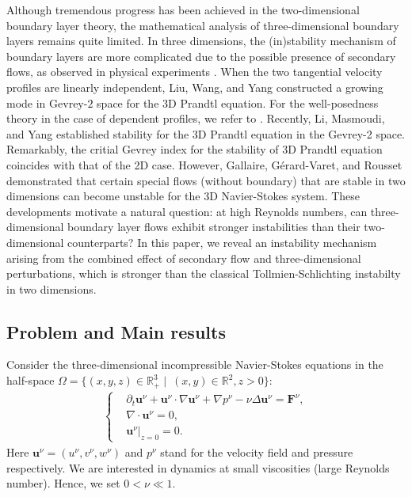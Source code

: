 \documentclass[reqno,11pt]{amsart}
\numberwithin{equation}{section}
\numberwithin{equation}{section}
\theoremstyle{plain}
\begin{document}
Although tremendous progress has been achieved in the two-dimensional boundary layer theory, the mathematical analysis of three-dimensional boundary layers remains quite limited. In three dimensions, the (in)stability mechanism of boundary layers are more complicated due to the possible presence of secondary flows, as observed in physical experiments \cite{RS,SY1985,SRW,Sch}.  When the two tangential velocity profiles are linearly independent, Liu, Wang, and Yang \cite{LWY} constructed a growing mode in Gevrey-$2$ space for the 3D Prandtl equation. For the well-posedness theory in the case of dependent profiles, we refer to \cite{LWY1,LWY2}. Recently, Li, Masmoudi, and Yang \cite{LWX2022} established stability for the 3D Prandtl equation in the Gevrey-2 space. Remarkably, the critial Gevrey index for the stability of 3D Prandtl equation coincides with that of the 2D case. However, Gallaire, G\'erard-Varet, and Rousset \cite{GGR} demonstrated that certain special flows (without boundary) that are stable in two dimensions can become unstable for the 3D Navier-Stokes system. These developments motivate a natural question: at high Reynolds numbers, can three-dimensional boundary layer flows exhibit stronger instabilities than their two-dimensional counterparts? In this paper, we reveal an instability mechanism arising from the combined effect of secondary flow and three-dimensional perturbations, which is stronger than the classical Tollmien-Schlichting instabilty in two dimensions.


\subsection{Problem and Main results}

Consider the three-dimensional incompressible Navier-Stokes equations in the half-space $\Omega=\{(x,y,z)\in \mathbb{R}_+^3\mid~(x,y)\in\mathbb{R}^2, z>0\}:$
\begin{align}\label{NS}
    \left\{
    \begin{aligned}
        &\partial_t \textbf{u}^\nu+\textbf{u}^\nu\cdot\nabla \textbf{u}^\nu+\nabla p^\nu-\nu\Delta \textbf{u}^\nu=\textbf{F}^\nu,
        \\ &\nabla\cdot \textbf{u}^\nu=0,\\
         &\textbf{u}^\nu|_{z=0}=0.
    \end{aligned}
    \right.
\end{align}
Here $\textbf{u}^{\nu}=(u^\nu,v^\nu,w^\nu)$ and $p^\nu$ stand for the velocity field and pressure respectively. We are interested in dynamics at small viscosities (large Reynolds number). Hence, we set $0<\nu\ll1.$
\end{document}
